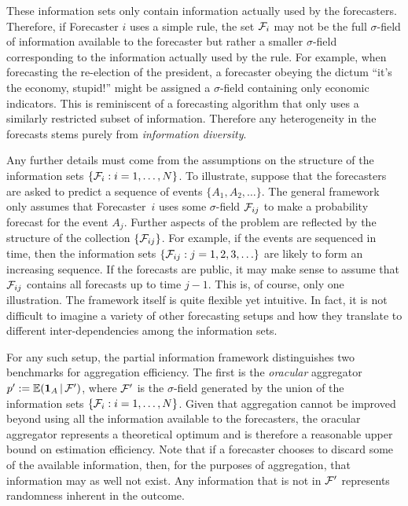 \documentclass[11pt]{article}
\newcommand{\E}{\mathbb{E}}
\theoremstyle{definition}
\theoremstyle{definition}
\def\one{{\bf 1}}
\def\F{{\cal F}}
\def\E{{\mathbb E}}
\def\|{\, | \,}
\begin{document}
These information sets only contain information actually used by the
forecasters. Therefore, if Forecaster $i$ uses a simple rule, the set $\F_i$ may not be the full $\sigma$-field of
information available to the forecaster but rather a smaller
$\sigma$-field corresponding to the information actually used by the
rule.  For example, when forecasting the re-election of the president,  a forecaster obeying the dictum ``it's the economy,
stupid!''  might be assigned a $\sigma$-field containing only economic
indicators.  This is reminiscent of a forecasting algorithm that only uses
a similarly restricted subset of information. Therefore
any heterogeneity in the forecasts stems purely from
\textit{information diversity}.  

Any further details must come from the
assumptions on the structure of the information sets $\{ \F_i : i = 1,
\dots, N\}$. To illustrate, suppose that the forecasters are asked to predict a sequence of events
$\{ A_1, A_2 , \ldots \}$. The general framework only assumes that
Forecaster~$i$ uses some $\sigma$-field $\F_{ij}$ to make a
probability forecast for the event $A_j$.  Further aspects of the problem
are reflected by the structure of the collection $\{ \F_{ij} \}$.  For
example, if the events are sequenced in time, then the information
sets $\{ \F_{ij} : j = 1 , 2, 3, \ldots \}$ are likely to form an
increasing sequence.  If the forecasts are public, it may make sense
to assume that $\F_{ij}$ contains all forecasts up to time $j-1$.
This is, of course, only one illustration. The framework itself is quite flexible
yet intuitive. In fact, it is not difficult to imagine a variety
of other forecasting setups and how they translate to
different inter-dependencies among the information sets.


For any such setup, the partial information framework distinguishes two benchmarks for aggregation efficiency.  The first is the {\em oracular} aggregator
$p' := \E (\one_A \| \F')$, where $\F'$ is the $\sigma$-field
generated by the union of the information sets $\{ \F_i : i = 1, \dots,
N\}$. Given that aggregation cannot be improved beyond using all the information available
to the forecasters, the oracular aggregator represents a theoretical optimum and is therefore a
reasonable upper bound on estimation efficiency. Note that if a forecaster chooses to discard
some of the available information, then, for the purposes of aggregation,
that information may as well not exist. Any
information that is not in $\F'$ represents randomness inherent in the
outcome.
\end{document}
